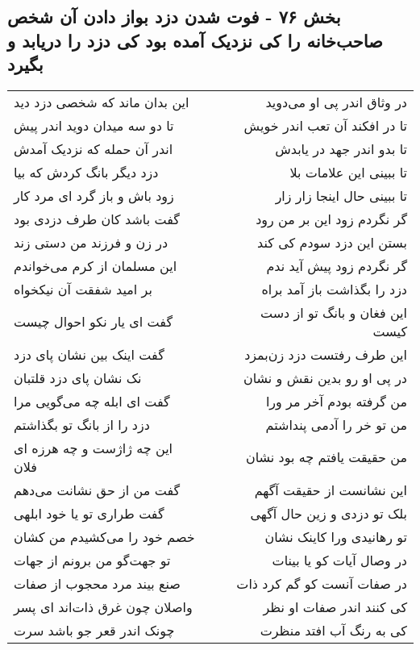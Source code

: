 \begin{center}
\section*{بخش ۷۶ - فوت شدن دزد بواز دادن آن شخص صاحب‌خانه را کی نزدیک آمده بود کی دزد را دریابد و بگیرد}
\label{sec:sh076}
\begin{longtable}{l p{0.5cm} r}
این بدان ماند که شخصی دزد دید
&&
در وثاق اندر پی او می‌دوید
\\
تا دو سه میدان دوید اندر پیش
&&
تا در افکند آن تعب اندر خویش
\\
اندر آن حمله که نزدیک آمدش
&&
تا بدو اندر جهد در یابدش
\\
دزد دیگر بانگ کردش که بیا
&&
تا ببینی این علامات بلا
\\
زود باش و باز گرد ای مرد کار
&&
تا ببینی حال اینجا زار زار
\\
گفت باشد کان طرف دزدی بود
&&
گر نگردم زود این بر من رود
\\
در زن و فرزند من دستی زند
&&
بستن این دزد سودم کی کند
\\
این مسلمان از کرم می‌خواندم
&&
گر نگردم زود پیش آید ندم
\\
بر امید شفقت آن نیکخواه
&&
دزد را بگذاشت باز آمد براه
\\
گفت ای یار نکو احوال چیست
&&
این فغان و بانگ تو از دست کیست
\\
گفت اینک بین نشان پای دزد
&&
این طرف رفتست دزد زن‌بمزد
\\
نک نشان پای دزد قلتبان
&&
در پی او رو بدین نقش و نشان
\\
گفت ای ابله چه می‌گویی مرا
&&
من گرفته بودم آخر مر ورا
\\
دزد را از بانگ تو بگذاشتم
&&
من تو خر را آدمی پنداشتم
\\
این چه ژاژست و چه هرزه ای فلان
&&
من حقیقت یافتم چه بود نشان
\\
گفت من از حق نشانت می‌دهم
&&
این نشانست از حقیقت آگهم
\\
گفت طراری تو یا خود ابلهی
&&
بلک تو دزدی و زین حال آگهی
\\
خصم خود را می‌کشیدم من کشان
&&
تو رهانیدی ورا کاینک نشان
\\
تو جهت‌گو من برونم از جهات
&&
در وصال آیات کو یا بینات
\\
صنع بیند مرد محجوب از صفات
&&
در صفات آنست کو گم کرد ذات
\\
واصلان چون غرق ذات‌اند ای پسر
&&
کی کنند اندر صفات او نظر
\\
چونک اندر قعر جو باشد سرت
&&
کی به رنگ آب افتد منظرت

\end{longtable}
\end{center}
